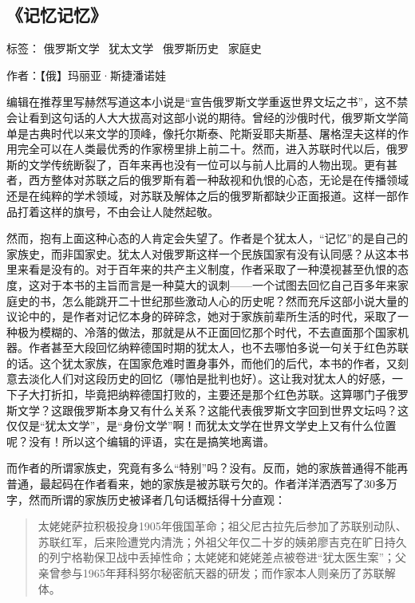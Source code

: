 \subsection{《记忆记忆》}

标签： 俄罗斯文学 \ 犹太文学 \ 俄罗斯历史 \ 家庭史

作者：【俄】玛丽亚·斯捷潘诺娃

编辑在推荐里写赫然写道这本小说是“宣告俄罗斯文学重返世界文坛之书”，这不禁会让看到这句话的人大大拔高对这部小说的期待。曾经的沙俄时代，俄罗斯文学简单是古典时代以来文学的顶峰，像托尔斯泰、陀斯妥耶夫斯基、屠格涅夫这样的作用完全可以在人类最优秀的作家榜里排上前二十。然而，进入苏联时代以后，俄罗斯的文学传统断裂了，百年来再也没有一位可以与前人比肩的人物出现。更有甚者，西方整体对苏联之后的俄罗斯有着一种敌视和仇恨的心态，无论是在传播领域还是在纯粹的学术领域，对苏联及解体之后的俄罗斯都缺少正面报道。这样一部作品打着这样的旗号，不由会让人陡然起敬。

然而，抱有上面这种心态的人肯定会失望了。作者是个犹太人，“记忆”的是自己的家族史，而非国家史。犹太人对俄罗斯这样一个民族国家有没有认同感？从这本书里来看是没有的。对于百年来的共产主义制度，作者采取了一种漠视甚至仇恨的态度，这对于本书的主旨而言是一种莫大的讽刺——一个试图去回忆自己百多年来家庭史的书，怎么能跳开二十世纪那些激动人心的历史呢？然而充斥这部小说大量的议论中的，是作者对记忆本身的碎碎念，她对于家族前辈所生活的时代，采取了一种极为模糊的、冷落的做法，那就是从不正面回忆那个时代，不去直面那个国家机器。作者甚至大段回忆纳粹德国时期的犹太人，也不去哪怕多说一句关于红色苏联的话。这个犹太家族，在国家危难时置身事外，而他们的后代，本书的作者，又刻意去淡化人们对这段历史的回忆（哪怕是批判也好）。这让我对犹太人的好感，一下子大打折扣，毕竟把纳粹德国打败的，主要还是那个红色苏联。这算哪门子俄罗斯文学？这跟俄罗斯本身又有什么关系？这能代表俄罗斯文字回到世界文坛吗？这仅仅是“犹太文学”，是“身份文学”啊！而犹太文学在世界文学史上又有什么位置呢？没有！所以这个编辑的评语，实在是搞笑地离谱。

而作者的所谓家族史，究竟有多么“特别”吗？没有。反而，她的家族普通得不能再普通，最起码在作者看来，她的家族是被苏联亏欠的。作者洋洋洒洒写了30多万字，然而所谓的家族历史被译者几句话概括得十分直观：
\begin{quotation}
太姥姥萨拉积极投身1905年俄国革命；祖父尼古拉先后参加了苏联别动队、苏联红军，后来险遭党内清洗；外祖父年仅二十岁的姨弟廖吉克在旷日持久的列宁格勒保卫战中丢掉性命；太姥姥和姥姥差点被卷进“犹太医生案”；父亲曾参与1965年拜科努尔秘密航天器的研发；而作家本人则亲历了苏联解体。
\end{quotation}

